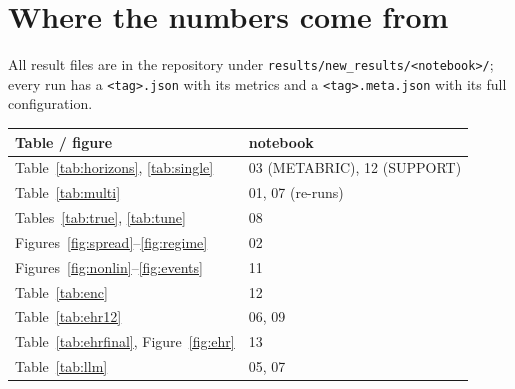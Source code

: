 \documentclass[11pt,a4paper]{article}
\begin{document}
\section{Where the numbers come from}\label{app:sources}
All result files are in the repository under \texttt{results/new\_results/<notebook>/}; every run has a
\texttt{<tag>.json} with its metrics and a \texttt{<tag>.meta.json} with its full configuration.
\begin{table}[H]\centering\small
\begin{tabular}{ll}
\toprule
Table / figure & notebook \\
\midrule
Table~\ref{tab:horizons}, \ref{tab:single} & 03 (METABRIC), 12 (SUPPORT) \\
Table~\ref{tab:multi} & 01, 07 (re-runs) \\
Tables~\ref{tab:true}, \ref{tab:tune} & 08 \\
Figures~\ref{fig:spread}--\ref{fig:regime} & 02 \\
Figures~\ref{fig:nonlin}--\ref{fig:events} & 11 \\
Table~\ref{tab:enc} & 12 \\
Table~\ref{tab:ehr12} & 06, 09 \\
Table~\ref{tab:ehrfinal}, Figure~\ref{fig:ehr} & 13 \\
Table~\ref{tab:llm} & 05, 07 \\
\bottomrule
\end{tabular}
\end{table}
\end{document}
